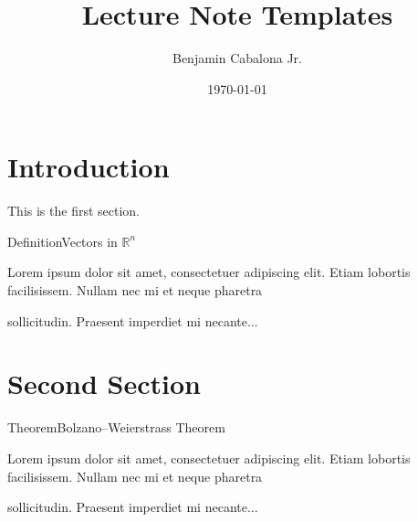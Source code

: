 \documentclass{article}
\title{Lecture Note Templates}
\author{Benjamin Cabalona Jr.}
\date{\today}
\begin{document}
\maketitle

\tableofcontents

\newpage

\section{Introduction}



This is the first section.

\lipsum[1-4] \newline

    \begin{DefinitionBox}[]{Definition}{Vectors in $\mathbb{R}^n$}
        
        Lorem ipsum dolor sit amet, consectetuer adipiscing elit.  
        Etiam lobortis facilisissem.  Nullam nec mi et neque pharetra 
        
        sollicitudin.  Praesent imperdiet mi necante...
    \end{DefinitionBox}

\section{Second Section}

\lipsum[1] \newline

    \begin{TheoremBox}{Theorem}{Bolzano–Weierstrass Theorem}
        
        Lorem ipsum dolor sit amet, consectetuer adipiscing elit.  
        Etiam lobortis facilisissem.  Nullam nec mi et neque pharetra 
        
        sollicitudin.  Praesent imperdiet mi necante...
    \end{TheoremBox}
\end{document}
